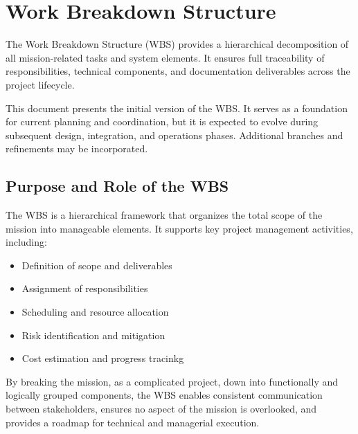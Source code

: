 \chapter{Work Breakdown Structure}
\label{chapter:WBS}

The Work Breakdown Structure (WBS) provides a hierarchical decomposition of all
mission-related tasks and system elements. It ensures full traceability of responsibilities, technical
components, and documentation deliverables across the project lifecycle. 

This document presents the initial version of the WBS. It serves as a foundation for current planning
and coordination, but it is expected to evolve during subsequent design, integration, and operations
phases. Additional branches and refinements may be incorporated.

\section{Purpose and Role of the WBS}

The WBS is a hierarchical framework that organizes the total scope
of the mission into manageable elements. It supports key project management activities, including:
\begin{itemize}
    \item Definition of scope and deliverables
    \item Assignment of responsibilities
    \item Scheduling and resource allocation
    \item Risk identification and mitigation
    \item Cost estimation and progress tracinkg    
\end{itemize}

By breaking the mission, as a complicated project, down into functionally and logically grouped components, the WBS enables consistent communication between stakeholders, ensures no aspect of the mission is overlooked, and provides a roadmap for technical and managerial execution.

